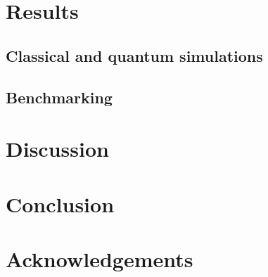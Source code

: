 \documentclass{article}
\begin{document}
\newpage
\section{Results}

\subsection{Classical and quantum simulations}
\subsection{Benchmarking}
\newpage
\section{Discussion}
\section{Conclusion}
\section{Acknowledgements}

\newpage
\printbibliography
\end{document}
